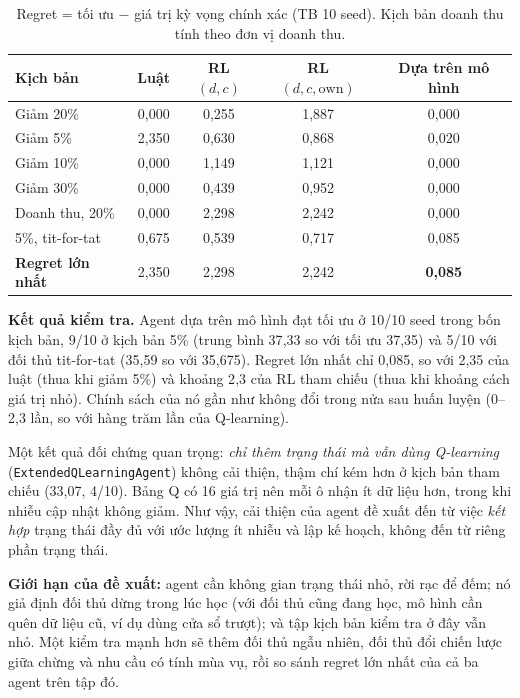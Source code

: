 \documentclass[12pt,a4paper]{report}
\begin{document}
\begin{table}[H]
\centering
\small
\caption{Regret = tối ưu $-$ giá trị kỳ vọng chính xác (TB 10 seed). Kịch bản doanh thu tính theo đơn vị doanh thu.}
\label{tab:regret}
\begin{tabular}{lcccc}
\toprule
Kịch bản & Luật & RL $(d,c)$ & RL $(d,c,\text{own})$ & Dựa trên mô hình \\
\midrule
Giảm 20\% & 0{,}000 & 0{,}255 & 1{,}887 & 0{,}000 \\
Giảm 5\% & 2{,}350 & 0{,}630 & 0{,}868 & 0{,}020 \\
Giảm 10\% & 0{,}000 & 1{,}149 & 1{,}121 & 0{,}000 \\
Giảm 30\% & 0{,}000 & 0{,}439 & 0{,}952 & 0{,}000 \\
Doanh thu, 20\% & 0{,}000 & 2{,}298 & 2{,}242 & 0{,}000 \\
5\%, tit-for-tat & 0{,}675 & 0{,}539 & 0{,}717 & 0{,}085 \\
\midrule
\textbf{Regret lớn nhất} & 2{,}350 & 2{,}298 & 2{,}242 & \textbf{0{,}085} \\
\bottomrule
\end{tabular}
\end{table}

\textbf{Kết quả kiểm tra.} Agent dựa trên mô hình đạt tối ưu ở 10/10 seed trong bốn
kịch bản, 9/10 ở kịch bản 5\% (trung bình 37{,}33 so với tối ưu 37{,}35) và 5/10 với
đối thủ tit-for-tat (35{,}59 so với 35{,}675). Regret lớn nhất chỉ 0{,}085, so với
2{,}35 của luật (thua khi giảm 5\%) và khoảng 2{,}3 của RL tham chiếu (thua khi khoảng
cách giá trị nhỏ). Chính sách của nó gần như không đổi trong nửa sau huấn luyện
(0--2{,}3 lần, so với hàng trăm lần của Q-learning).

Một kết quả đối chứng quan trọng: \emph{chỉ thêm trạng thái mà vẫn dùng Q-learning}
(\texttt{ExtendedQLearningAgent}) không cải thiện, thậm chí kém hơn ở kịch bản
tham chiếu (33{,}07, 4/10). Bảng Q có 16 giá trị nên mỗi ô nhận ít dữ liệu hơn, trong
khi nhiễu cập nhật không giảm. Như vậy, cải thiện của agent đề xuất đến từ việc
\emph{kết hợp} trạng thái đầy đủ với ước lượng ít nhiễu và lập kế hoạch, không đến
từ riêng phần trạng thái.

\textbf{Giới hạn của đề xuất:} agent cần không gian trạng thái nhỏ, rời rạc để
đếm; nó giả định đối thủ dừng trong lúc học (với đối thủ cũng đang học, mô hình cần
quên dữ liệu cũ, ví dụ dùng cửa sổ trượt); và tập kịch bản kiểm tra ở đây vẫn nhỏ.
Một kiểm tra mạnh hơn sẽ thêm đối thủ ngẫu nhiên, đối thủ đổi chiến lược giữa chừng
và nhu cầu có tính mùa vụ, rồi so sánh regret lớn nhất của cả ba agent trên tập đó.
\end{document}
